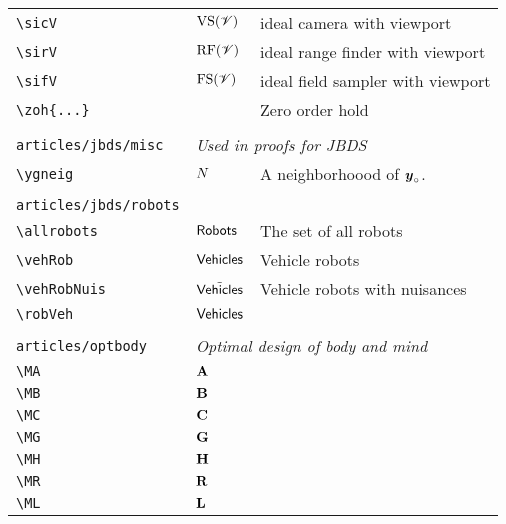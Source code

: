 \begin{longtable}{lll}
 {\color[rgb]{0.5,0.5,0.5}\texttt{\textbackslash sicV}} & $\text{VS}(\mathscr{V})$ &  ideal camera with viewport\\ 
 {\color[rgb]{0.5,0.5,0.5}\texttt{\textbackslash sirV}} & $\text{RF}(\mathscr{V})$ &  ideal range finder with viewport\\ 
 {\color[rgb]{0.5,0.5,0.5}\texttt{\textbackslash sifV}} & $\text{FS}(\mathscr{V})$ &  ideal field sampler with viewport\\ 
 {\color[rgb]{0.5,0.5,0.5}\texttt{\textbackslash zoh\{...\}}} &  &  Zero order hold\\ 
  &  & \\ 
 {\color[rgb]{0.5,0.5,0.5}\texttt{articles/jbds/misc}} & \multicolumn{2}{l}{\emph{Used in proofs for JBDS}}\\ 
 \hline
{\color[rgb]{0.5,0.5,0.5}\texttt{\textbackslash ygneig}} & $N$ &  A neighborhoood of $\boldsymbol{y}_{\circ}$.\\ 
  &  & \\ 
 {\color[rgb]{0.5,0.5,0.5}\texttt{articles/jbds/robots}} & \multicolumn{2}{l}{\emph{}}\\ 
 \hline
{\color[rgb]{0.5,0.5,0.5}\texttt{\textbackslash allrobots}} & $\mathsf{Robots}$ &  The set of all robots\\ 
 {\color[rgb]{0.5,0.5,0.5}\texttt{\textbackslash vehRob}} & $\mathsf{Vehicles}$ &  Vehicle robots\\ 
 {\color[rgb]{0.5,0.5,0.5}\texttt{\textbackslash vehRobNuis}} & ${\tilde{\mathsf{Vehicles}}}$ &  Vehicle robots with nuisances\\ 
 {\color[rgb]{0.5,0.5,0.5}\texttt{\textbackslash robVeh}} & $\mathsf{Vehicles}$ & \\ 
  &  & \\ 
 {\color[rgb]{0.5,0.5,0.5}\texttt{articles/optbody}} & \multicolumn{2}{l}{\emph{Optimal design of body and mind}}\\ 
 \hline
{\color[rgb]{0.5,0.5,0.5}\texttt{\textbackslash MA}} & $\mathbf{A}$ & \\ 
 {\color[rgb]{0.5,0.5,0.5}\texttt{\textbackslash MB}} & $\mathbf{B}$ & \\ 
 {\color[rgb]{0.5,0.5,0.5}\texttt{\textbackslash MC}} & $\mathbf{C}$ & \\ 
 {\color[rgb]{0.5,0.5,0.5}\texttt{\textbackslash MG}} & $\mathbf{G}$ & \\ 
 {\color[rgb]{0.5,0.5,0.5}\texttt{\textbackslash MH}} & $\mathbf{H}$ & \\ 
 {\color[rgb]{0.5,0.5,0.5}\texttt{\textbackslash MR}} & $\mathbf{R}$ & \\ 
 {\color[rgb]{0.5,0.5,0.5}\texttt{\textbackslash ML}} & $\mathbf{L}$ & \\ 

\end{longtable}
